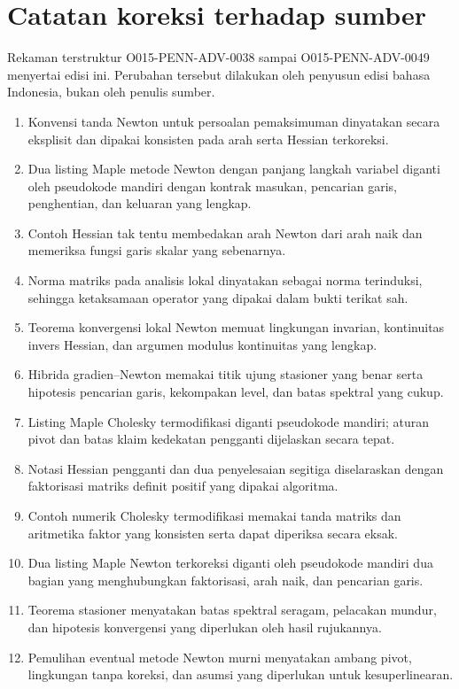 \documentclass[a4paper,openany,leqno,fleqn,12pt]{amsbook}
\numberwithin{equation}{chapter}
\numberwithin{figure}{chapter}
\theoremstyle{definition}
\theoremstyle{remark}
\begin{document}
\mainmatter
\setcounter{chapter}{4}
\setcounter{cgalgorithm}{9}


\backmatter


\chapter*{Catatan koreksi terhadap sumber}
Rekaman terstruktur O015-PENN-ADV-0038 sampai O015-PENN-ADV-0049 menyertai
edisi ini. Perubahan tersebut dilakukan oleh penyusun edisi bahasa Indonesia,
bukan oleh penulis sumber.

\begin{enumerate}
  \item Konvensi tanda Newton untuk persoalan pemaksimuman dinyatakan secara
  eksplisit dan dipakai konsisten pada arah serta Hessian terkoreksi.
  \item Dua listing Maple metode Newton dengan panjang langkah variabel
  diganti oleh pseudokode mandiri dengan kontrak masukan, pencarian garis,
  penghentian, dan keluaran yang lengkap.
  \item Contoh Hessian tak tentu membedakan arah Newton dari arah naik dan
  memeriksa fungsi garis skalar yang sebenarnya.
  \item Norma matriks pada analisis lokal dinyatakan sebagai norma terinduksi,
  sehingga ketaksamaan operator yang dipakai dalam bukti terikat sah.
  \item Teorema konvergensi lokal Newton memuat lingkungan invarian,
  kontinuitas invers Hessian, dan argumen modulus kontinuitas yang lengkap.
  \item Hibrida gradien--Newton memakai titik ujung stasioner yang benar serta
  hipotesis pencarian garis, kekompakan level, dan batas spektral yang cukup.
  \item Listing Maple Cholesky termodifikasi diganti pseudokode mandiri; aturan
  pivot dan batas klaim kedekatan pengganti dijelaskan secara tepat.
  \item Notasi Hessian pengganti dan dua penyelesaian segitiga diselaraskan
  dengan faktorisasi matriks definit positif yang dipakai algoritma.
  \item Contoh numerik Cholesky termodifikasi memakai tanda matriks dan
  aritmetika faktor yang konsisten serta dapat diperiksa secara eksak.
  \item Dua listing Maple Newton terkoreksi diganti oleh pseudokode mandiri
  dua bagian yang menghubungkan faktorisasi, arah naik, dan pencarian garis.
  \item Teorema stasioner menyatakan batas spektral seragam, pelacakan mundur,
  dan hipotesis konvergensi yang diperlukan oleh hasil rujukannya.
  \item Pemulihan eventual metode Newton murni menyatakan ambang pivot,
  lingkungan tanpa koreksi, dan asumsi yang diperlukan untuk kesuperlinearan.
\end{enumerate}
\end{document}
